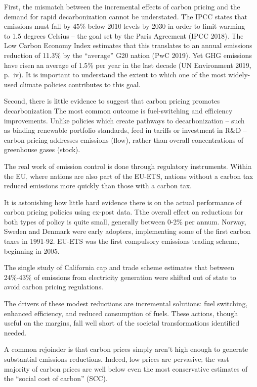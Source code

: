 \documentclass[
]{book}
\begin{document}
First, the mismatch between the incremental effects of
carbon pricing and the demand for rapid decarbonization cannot be understated. The IPCC
states that emissions must fall by 45\% below 2010 levels by 2030 in order to limit warming to
1.5 degrees Celsius -- the goal set by the Paris Agreement (IPCC 2018). The Low Carbon
Economy Index estimates that this translates to an annual emissions reduction of 11.3\% by the
``average'' G20 nation (PwC 2019). Yet GHG emissions have risen an average of 1.5\% per year in
the last decade (UN Environment 2019, p.~iv). It is important to understand the extent to which
one of the most widely-used climate policies contributes to this goal.

Second, there is little evidence to suggest that carbon pricing promotes decarbonization
The most common outcome is fuel-switching and efficiency improvements.
Unlike policies which create pathways to decarbonization -- such as binding renewable
portfolio standards, feed in tariffs or investment in R\&D --
carbon pricing addresses emissions (flow), rather than overall concentrations of
greenhouse gases (stock).

The real work of emission control is done through regulatory instruments.
Within the EU, where nations are also part of the EU-ETS, nations without a carbon
tax reduced emissions more quickly than those with a carbon tax.

It is astonishing how little hard evidence there is on the actual performance of
carbon pricing policies using ex-post data.
Tthe overall effect on reductions for both types of policy is
quite small, generally between 0-2\% per annum.
Norway, Sweden and Denmark were early
adopters, implementing some of the first carbon taxes in 1991-92.
EU-ETS was the first compulsory emissions trading scheme, beginning in 2005.

The single study of California cap and trade scheme
estimates that between 24\%-43\% of emissions from electricity generation were shifted out of
state to avoid carbon pricing regulations.

The drivers of these modest reductions are incremental solutions: fuel switching,
enhanced efficiency, and reduced consumption of fuels.
These actions, though useful on the margins, fall well short of
the societal transformations identified needed.

A common rejoinder is that carbon prices simply aren't high enough to generate substantial
emissions reductions.
Indeed, low prices are pervasive; the vast majority of carbon prices are
well below even the most conservative estimates of the ``social cost of carbon'' (SCC).
\end{document}
